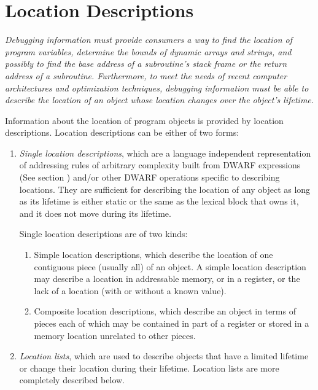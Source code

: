 \section{Location Descriptions}
\label{chap:locationdescriptions}
\textit{ Debugging information must provide consumers a way to find
the location of program variables, determine the bounds
of dynamic arrays and strings, and possibly to find the
base address of a subroutine’s stack frame or the return
address of a subroutine. Furthermore, to meet the needs of
recent computer architectures and optimization techniques,
debugging information must be able to describe the location of
an object whose location changes over the object’s lifetime.}

Information about the location of program objects is provided
by location descriptions. Location descriptions can be either
of two forms:
\begin{enumerate}[1]
\item \textit{Single location descriptions}, which are a language independent representation of
addressing rules of arbitrary complexity built from 
DWARF expressions (See section ) 
and/or other
DWARF operations specific to describing locations. They are
sufficient for describing the location of any object as long
as its lifetime is either static or the same as the lexical
block that owns it, and it does not move during its lifetime.

Single location descriptions are of two kinds:
\begin{enumerate}[a]
\item Simple location descriptions, which describe the location
of one contiguous piece (usually all) of an object. A simple
location description may describe a location in addressable
memory, or in a register, or the lack of a location (with or
without a known value).

\item  Composite location descriptions, which describe an
object in terms of pieces each of which may be contained in
part of a register or stored in a memory location unrelated
to other pieces.

\end{enumerate}
\item \textit{Location lists}, which are used to describe
objects that have a limited lifetime or change their location
during their lifetime. Location lists are more completely
described below.

\end{enumerate}

